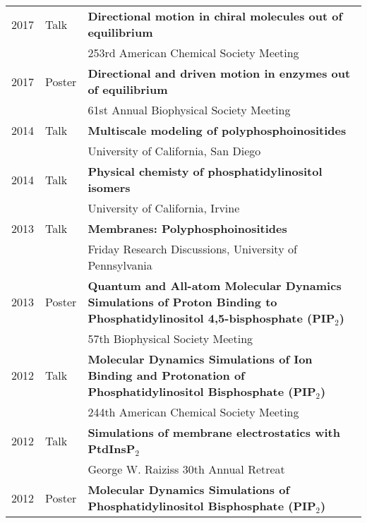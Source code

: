 \documentclass[letterpaper,11pt]{article}
\begin{document}
\begin{tabular}{ll p{14 cm}}
2017 & Talk & \textbf{Directional motion in chiral molecules out of equilibrium} \\
     && 253rd American Chemical Society Meeting \\
2017 & Poster & \textbf{Directional and driven motion in enzymes out of equilibrium} \\
     && 61st Annual Biophysical Society Meeting \\     
2014 & Talk & \textbf{Multiscale modeling of polyphosphoinositides}\\
     && University of California, San Diego\\
2014 & Talk & \textbf{Physical chemisty of phosphatidylinositol isomers}\\
     && University of California, Irvine\\
2013 & Talk & \textbf{Membranes: Polyphosphoinositides}\\
     && Friday Research Discussions, University of Pennsylvania\\
2013 & Poster & \textbf{Quantum and All-atom Molecular Dynamics Simulations of Proton   Binding to Phosphatidylinositol 4,5-bisphosphate (PIP$_2$)}\\
     && 57th Biophysical Society Meeting\\
2012 & Talk & \textbf{Molecular Dynamics Simulations of Ion Binding and Protonation of 
Phosphatidylinositol Bisphosphate (PIP$_2$)} \\
     && 244th American Chemical Society Meeting \\
2012 & Talk & \textbf{Simulations of membrane electrostatics with PtdInsP$_2$}\\
     && George W. Raiziss 30th Annual Retreat \\
2012 & Poster & \textbf{Molecular Dynamics Simulations of Phosphatidylinositol Bisphosphate (PIP$_2$)}\\

\end{tabular}
\end{document}
